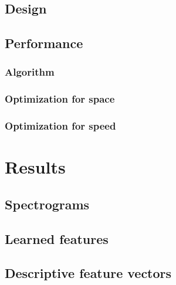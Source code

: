 \documentclass[a4paper,12pt,twoside]{report}
\begin{document}
\section{Design}

\section{Performance}

\subsection{Algorithm}

\subsection{Optimization for space}

\subsection{Optimization for speed}

\chapter{Results}
\label{results}

\section{Spectrograms}

\section{Learned features}

\section{Descriptive feature vectors}
\end{document}
